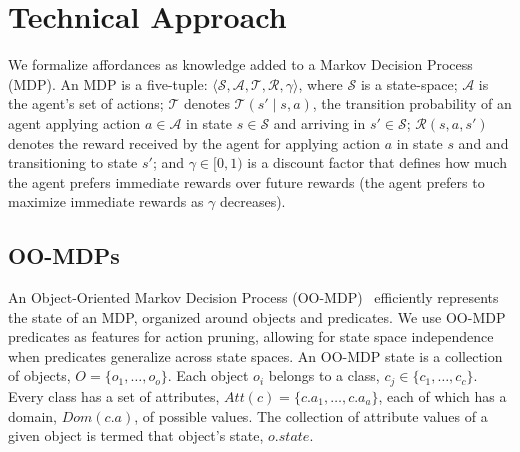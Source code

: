 \documentclass[conference]{IEEEtran}
\begin{document}

\section{Technical Approach}
\label{sec:technical_approach}

We formalize affordances as knowledge added to a Markov Decision Process
(MDP).  An MDP is a five-tuple: $\langle \mathcal{S}, \mathcal{A},
\mathcal{T}, \mathcal{R}, \gamma \rangle$, where $\mathcal{S}$ is a
state-space; $\mathcal{A}$ is the agent's set of actions;
$\mathcal{T}$ denotes $\mathcal{T}(s' \mid s,a)$, the transition
probability of an agent applying action $a \in \mathcal{A}$ in state
$s \in \mathcal{S}$ and arriving in $s' \in \mathcal{S}$;
$\mathcal{R}(s,a,s')$ denotes the reward received by the agent for
applying action $a$ in state $s$ and and transitioning to state $s'$;
and $\gamma \in [0, 1)$ is a discount factor that defines how much the
agent prefers immediate rewards over future rewards (the agent
prefers to maximize immediate rewards as $\gamma$ decreases).

\subsection{OO-MDPs}

An Object-Oriented Markov Decision Process (OO-MDP)~\citep{diuk08}
efficiently represents the state of an MDP, organized around objects
and predicates. We use OO-MDP predicates as features for action
pruning, allowing for state space independence when predicates
generalize across state spaces.  An OO-MDP state is a collection of
objects, $O = \{o_1, \ldots, o_o \}$.  Each object $o_i$ belongs to a
class, $c_j \in \{c_1, \ldots, c_c\}$. Every class has a set of
attributes, $Att(c) = \{c.a_1, \ldots, c.a_a \}$, each of which has a
domain, $Dom(c.a)$, of possible values. The collection of attribute
values of a given object is termed that object's state, $o.state$. 

\end{document}
